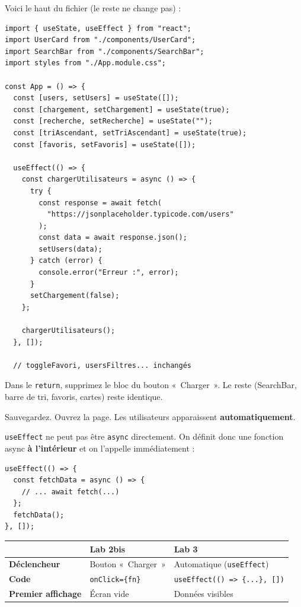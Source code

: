 \documentclass[11pt,a4paper]{article}
\begin{document}
Voici le haut du fichier (le reste ne change pas) :

\begin{lstlisting}
import { useState, useEffect } from "react";
import UserCard from "./components/UserCard";
import SearchBar from "./components/SearchBar";
import styles from "./App.module.css";

const App = () => {
  const [users, setUsers] = useState([]);
  const [chargement, setChargement] = useState(true);
  const [recherche, setRecherche] = useState("");
  const [triAscendant, setTriAscendant] = useState(true);
  const [favoris, setFavoris] = useState([]);

  useEffect(() => {
    const chargerUtilisateurs = async () => {
      try {
        const response = await fetch(
          "https://jsonplaceholder.typicode.com/users"
        );
        const data = await response.json();
        setUsers(data);
      } catch (error) {
        console.error("Erreur :", error);
      }
      setChargement(false);
    };

    chargerUtilisateurs();
  }, []);

  // toggleFavori, usersFiltres... inchangés
\end{lstlisting}

Dans le \texttt{return}, supprimez le bloc du bouton «~Charger~». Le reste (SearchBar, barre de tri, favoris, cartes) reste identique.

Sauvegardez. Ouvrez la page. Les utilisateurs apparaissent \textbf{automatiquement}.

\begin{attentionbox}
\texttt{useEffect} ne peut pas être \texttt{async} directement. On définit donc une fonction async \textbf{à l'intérieur} et on l'appelle immédiatement :
\begin{lstlisting}
useEffect(() => {
  const fetchData = async () => {
    // ... await fetch(...)
  };
  fetchData();
}, []);
\end{lstlisting}
\end{attentionbox}

\begin{retenirbox}
\begin{center}
\begin{tabular}{lp{5cm}p{5cm}}
\toprule
& \textbf{Lab 2bis} & \textbf{Lab 3} \\
\midrule
\textbf{Déclencheur} & Bouton «~Charger~» & Automatique (\texttt{useEffect}) \\
\textbf{Code} & \texttt{onClick=\{fn\}} & \texttt{useEffect(() => \{...\}, [])} \\
\textbf{Premier affichage} & Écran vide & Données visibles \\
\bottomrule
\end{tabular}
\end{center}
\end{retenirbox}
\end{document}
